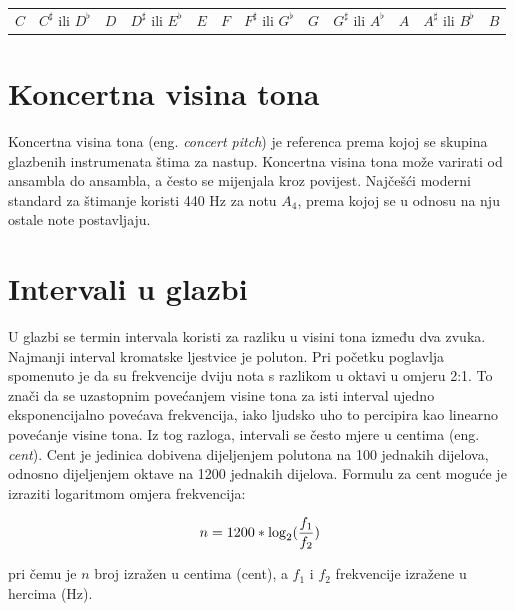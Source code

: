 \documentclass[times, utf8, zavrsni, numeric]{fer}
\begin{document}
\begin{center}
	\begin{tabular}{c c c c c c c c c c c c}
		$C$ & $C^\sharp$ ili $D^\flat$ & $D$ & $D^\sharp$ ili $E^\flat$ & $E$ & $F$ & $F^\sharp$ ili $G^\flat$ & $G$ & $G^\sharp$ ili $A^\flat$ & $A$ & $A^\sharp$ ili $B^\flat$ & $B$\\
	\end{tabular}
\end{center}

\section{Koncertna visina tona}
Koncertna visina tona (eng. \textit{concert pitch}) je referenca prema kojoj se skupina glazbenih instrumenata štima za nastup. Koncertna visina tona može varirati od ansambla do ansambla, a često se mijenjala kroz povijest. Najčešći moderni standard za štimanje koristi 440 Hz za notu $A_4$, prema kojoj se u odnosu na nju ostale note postavljaju.

\section{Intervali u glazbi}
U glazbi se termin intervala koristi za razliku u visini tona između dva zvuka.\cite{prout2011harmony} Najmanji interval kromatske ljestvice je poluton. Pri početku poglavlja spomenuto je da su frekvencije dviju nota s razlikom u oktavi u omjeru 2:1. To znači da se uzastopnim povećanjem visine tona za isti interval ujedno eksponencijalno povećava frekvencija, iako ljudsko uho to percipira kao linearno povećanje visine tona. Iz tog razloga, intervali se često mjere u centima (eng. \textit{cent}).\cite{benson2006music} Cent je jedinica dobivena dijeljenjem polutona na 100 jednakih dijelova, odnosno dijeljenjem oktave na 1200 jednakih dijelova.  Formulu za cent moguće je izraziti logaritmom omjera frekvencija:

\begin{equation}
	n = 1200 * \log_2(\dfrac{f_1}{f_2}) \\ 
\end{equation}

pri čemu je $n$ broj izražen u centima (cent), a $f_1$ i $f_2$ frekvencije izražene u hercima (Hz).
\end{document}
